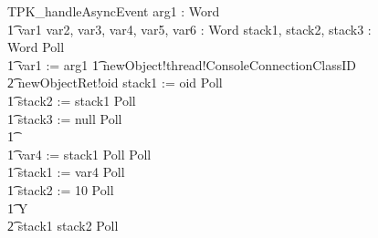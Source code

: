 \begin{figure}[tbp!]
  \centering
  \setlength{\zedtab}{0.5cm}
  \setlength{\zedindent}{0pt}
  \setlength{\zedleftsep}{0pt}
  \setlength{\abovedisplayskip}{0pt}
  \setlength{\belowdisplayskip}{0pt}
  \setlength{\abovedisplayshortskip}{0pt}
  \setlength{\belowdisplayshortskip}{0pt}
  \begin{circusaction}
    TPK\_handleAsyncEvent \circdef \circval arg1 : Word \circspot \\
    \t1 \circvar var1 var2, var3, var4, var5, var6 : Word \circspot \circvar stack1, stack2, stack3 : Word \circspot Poll \circseq \\
    \t1 var1 := arg1
    \t1 newObject!thread!ConsoleConnectionClassID \\
    \t2 {} \then  newObjectRet!oid \then stack1 := oid \circseq Poll \circseq \\
    \t1 stack2 := stack1 \circseq Poll \circseq \\
    \t1 stack3 := null \circseq Poll \circseq \\
    \t1 {} \cdots {} \\
    \t1 var4 := stack1 \circseq Poll \circseq Poll \circseq \\
    \t1 stack1 := var4 \circseq Poll \circseq \\
    \t1 stack2 := 10 \circseq Poll \circseq \\
    \t1 \circmu Y \circspot \\
    \t2 \circif stack1 \leq stack2 \circthen Poll \circseq \\

\end{circusaction}
\end{figure}
